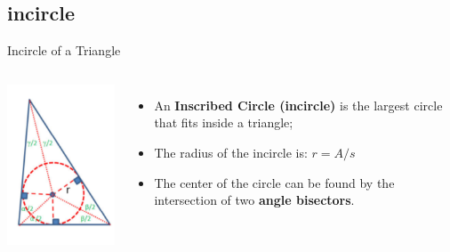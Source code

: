 \subsection{incircle}
\begin{frame}[fragile]{Incircle of a Triangle}
    \begin{columns}
      \includegraphics[width=1\textwidth]{../img/incircle_halim}
      \begin{itemize}
        \item An {\bf Inscribed Circle (incircle)} is the largest circle that fits inside a triangle;
        \item The radius of the incircle is: $r = A / s$
        \item The center of the circle can be found by the intersection of two {\bf angle bisectors}.
      \end{itemize}
      \end{columns}


\end{frame}
